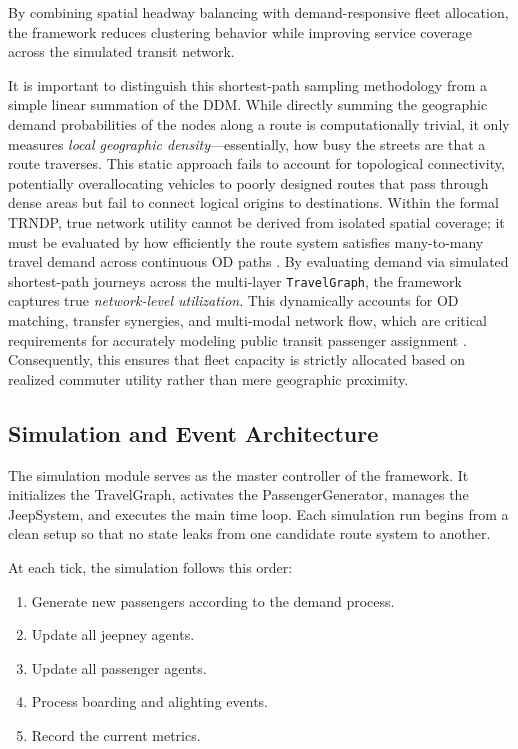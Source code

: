 {{By combining spatial headway balancing with demand-responsive fleet allocation, the framework reduces clustering behavior while improving service coverage across the simulated transit network.

It is important to distinguish this shortest-path sampling methodology from a simple linear summation of the \ac{DDM}. While directly summing the geographic demand probabilities of the nodes along a route is computationally trivial, it only measures \textit{local geographic density}---essentially, how busy the streets are that a route traverses. This static approach fails to account for topological connectivity, potentially overallocating vehicles to poorly designed routes that pass through dense areas but fail to connect logical origins to destinations. Within the formal \ac{TRNDP}, true network utility cannot be derived from isolated spatial coverage; it must be evaluated by how efficiently the route system satisfies many-to-many travel demand across continuous \ac{OD} paths \citep{kepaptsoglou2009transit}. By evaluating demand via simulated shortest-path journeys across the multi-layer \texttt{TravelGraph}, the framework captures true \textit{network-level utilization}. This dynamically accounts for \ac{OD} matching, transfer synergies, and multi-modal network flow, which are critical requirements for accurately modeling public transit passenger assignment \citep{farahani2013review}. Consequently, this ensures that fleet capacity is strictly allocated based on realized commuter utility rather than mere geographic proximity.

\subsection{Simulation and Event Architecture}
\noindent
The simulation module serves as the master controller of the framework. It initializes the TravelGraph, activates the PassengerGenerator, manages the JeepSystem, and executes the main time loop. Each simulation run begins from a clean setup so that no state leaks from one candidate route system to another.

At each tick, the simulation follows this order:
\begin{enumerate}
  \setlength{\itemsep}{0pt}
  \setlength{\parskip}{0pt}
  \setlength{\parsep}{0pt}
  \item Generate new passengers according to the demand process.
  \item Update all jeepney agents.
  \item Update all passenger agents.
  \item Process boarding and alighting events.
  \item Record the current metrics.
\end{enumerate}

}}
